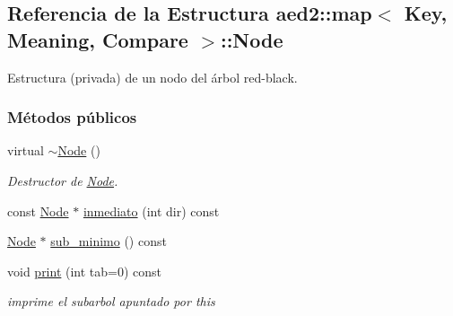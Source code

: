 \hypertarget{structaed2_1_1map_1_1Node}{\subsection{\-Referencia de la \-Estructura aed2\-:\-:map$<$ \-Key, \-Meaning, \-Compare $>$\-:\-:\-Node}
\label{structaed2_1_1map_1_1Node}
}


\-Estructura (privada) de un nodo del árbol red-\/black.  


\subsubsection*{\-Métodos públicos}
\begin{DoxyCompactItemize}
\item 
virtual \hyperlink{structaed2_1_1map_1_1Node_a4f3cb2cc4302fe96432e624ced147540_a4f3cb2cc4302fe96432e624ced147540}{$\sim$\-Node} ()
\begin{DoxyCompactList}\small\item\em \-Destructor de \hyperlink{structaed2_1_1map_1_1Node}{\-Node}. \end{DoxyCompactList}\item 
const \hyperlink{structaed2_1_1map_1_1Node}{\-Node} $\ast$ \hyperlink{structaed2_1_1map_1_1Node_a4d5263c74ea5f78025fea331267730ce_a4d5263c74ea5f78025fea331267730ce}{inmediato} (int dir) const 
\item 
\hyperlink{structaed2_1_1map_1_1Node}{\-Node} $\ast$ \hyperlink{structaed2_1_1map_1_1Node_ae3420a3dca910d193089461151b8dc4e_ae3420a3dca910d193089461151b8dc4e}{sub\-\_\-minimo} () const 
\item 
void \hyperlink{structaed2_1_1map_1_1Node_a1c56c9d119479b77b8abb7343a224c7a_a1c56c9d119479b77b8abb7343a224c7a}{print} (int tab=0) const 
\begin{DoxyCompactList}\small\item\em imprime el subarbol apuntado por this \end{DoxyCompactList}\end{DoxyCompactItemize}
